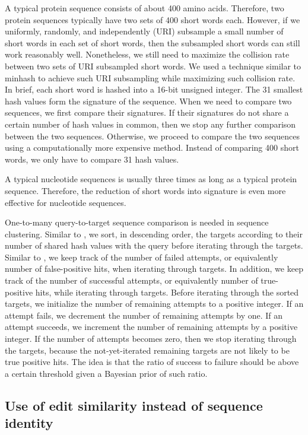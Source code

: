 \documentclass[]{article}
\begin{document}
A typical protein sequence consists of about 400 amino acids.
Therefore, two protein sequences typically have two sets of 400 short words each.
However, if we uniformly, randomly, and independently (URI) subsample a small number of short words in each set of short words, then the subsampled short words can still work reasonably well. 
Nonetheless, we still need to maximize the collision rate between two sets of URI subsampled short words.
We used a technique similar to minhash to achieve such URI subsampling while maximizing such collision rate.
In brief, each short word is hashed into a 16-bit unsigned integer.
The 31 smallest hash values form the signature of the sequence.
When we need to compare two sequences, we first compare their signatures.
If their signatures do not share a certain number of hash values in common, then we stop any further comparison between the two sequences. 
Otherwise, we proceed to compare the two sequences using a computationally more expensive method.
Instead of comparing 400 short words, we only have to compare 31 hash values.

A typical nucleotide sequences is usually three times as long as a typical protein sequence.
Therefore, the reduction of short words into signature is even more effective for nucleotide sequences.

One-to-many query-to-target sequence comparison is needed in sequence clustering. 
Similar to \cite{li2006cd}, we sort, in descending order, the targets according to their number of shared hash values with the query before iterating through the targets. 
Similar to \cite{edgar2010search}, we keep track of the number of failed attempts, or equivalently number of false-positive hits, when iterating through targets.
In addition, we keep track of the number of successful attempts, or equivalently number of true-positive hits, while iterating through targets.
Before iterating through the sorted targets, we initialize the number of remaining attempts to a positive integer.
If an attempt fails, we decrement the number of remaining attempts by one.
If an attempt succeeds, we increment the number of remaining attempts by a positive integer.
If the number of attempts becomes zero, then we stop iterating through the targets, because the not-yet-iterated remaining targets are not likely to be true positive hits.
The idea is that the ratio of success to failure should be above a certain threshold given a Bayesian prior of such ratio.

\subsection{Use of edit similarity instead of sequence identity}
\end{document}

